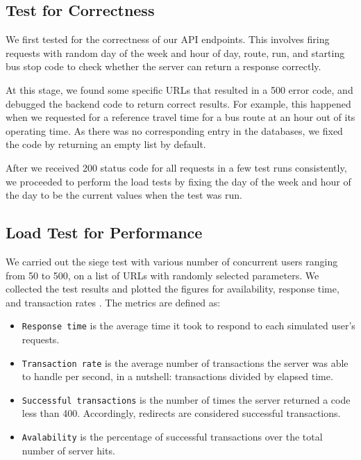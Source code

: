 \subsection{Test for Correctness}
\par We first tested for the correctness of our API endpoints. This involves firing requests with random day of the week and hour of day, route, run, and starting bus stop code to check whether the server can return a response correctly.

\par At this stage, we found some specific URLs that resulted in a 500 error code, and debugged the backend code to return correct results. For example, this happened when we requested for a reference travel time for a bus route at an hour out of its operating time. As there was no corresponding entry in the databases, we fixed the code by returning an empty list by default.

\par After we received 200 status code for all requests in a few test runs consistently, we proceeded to perform the load tests by fixing the day of the week and hour of the day to be the current values when the test was run.

\subsection{Load Test for Performance}
\par We carried out the siege test with various number of concurrent users ranging from 50 to 500, on a list of URLs with randomly selected parameters. We collected the test results and plotted the figures for availability, response time, and transaction rates \cite{siege_manual}. The metrics are defined as:

\begin{itemize}
  \item \texttt{Response time} is the average time it took to respond to each simulated user’s requests.

  \item \texttt{Transaction rate} is the average number of transactions the server was able to handle per second, in a nutshell: transactions divided by elapsed time.

  \item \texttt{Successful transactions} is the number of times the server returned a code less than 400. Accordingly, redirects are considered successful transactions.

  \item \texttt{Avalability} is the percentage of successful transactions over the total number of server hits.
\end{itemize}


